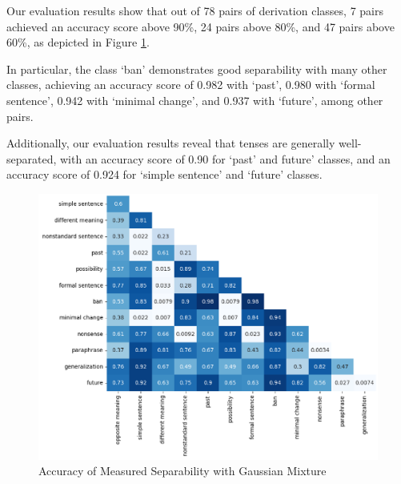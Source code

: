 \documentclass[11pt]{article}
\begin{document}
Our evaluation results show that out of 78 pairs of derivation classes, 7 pairs achieved an accuracy score above 90\%, 24 pairs above 80\%, and 47 pairs above 60\%, as depicted in Figure \ref{fig:GM}.

In particular, the class `ban' demonstrates good separability with many other classes, achieving an accuracy score of 0.982 with `past', 0.980 with `formal sentence', 0.942 with `minimal change', and 0.937 with `future', among other pairs.

Additionally, our evaluation results reveal that tenses are generally well-separated, with an accuracy score of 0.90 for `past' and future' classes, and an accuracy score of 0.924 for `simple sentence' and `future' classes.

\begin{figure}[htp]
    \centering
    \includegraphics[scale=0.4]{GM.png}
    \caption{Accuracy of Measured Separability with Gaussian Mixture}
    \label{fig:GM}
\end{figure}






\end{document}
